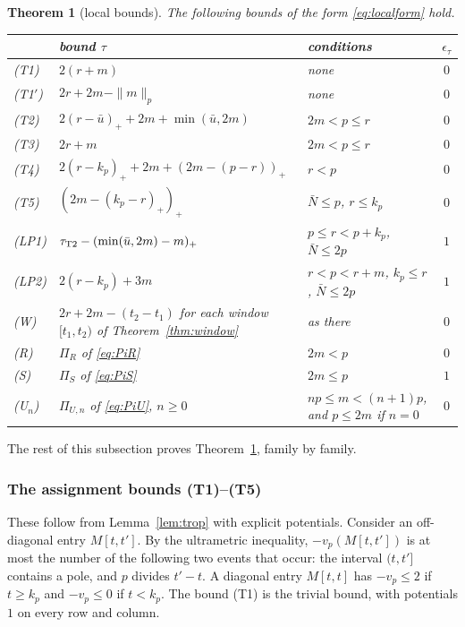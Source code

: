 \documentclass[11pt]{amsart}
\newtheorem{theorem}{Theorem}[section]
\theoremstyle{definition}
\theoremstyle{remark}
\numberwithin{equation}{section}
\begin{document}
\begin{theorem}[local bounds]\label{thm:local}
The following bounds of the form \eqref{eq:localform} hold.
\begin{center}
{\renewcommand{\arraystretch}{1.2}
\begin{tabular}{@{}lp{}p{}c@{}}
\toprule
 & bound $\tau$ & conditions & $\epsilon_\tau$\\
\midrule
(T1) & $2(r+m)$ & none & $0$\\
(T1$'$) & $2r+2m-\|m\|_p$ & none & $0$\\
(T2) & $2(r-\bar u)_++2m+\min(\bar u,2m)$ & $2m<p\le r$ & $0$\\
(T3) & $2r+m$ & $2m<p\le r$ & $0$\\
(T4) & $2(r-k_p)_++2m+(2m-(p-r))_+$ & $r<p$ & $0$\\
(T5) & $(2m-(k_p-r)_+)_+$ & $\bar N\le p$, $r\le k_p$ & $0$\\
(LP1) & $\tau_{\rm T2}-(\min(\bar u,2m)-m)_+$ & $p\le r<p+k_p$, $\bar N\le2p$ & $1$\\
(LP2) & $2(r-k_p)+3m$ & $r<p<r+m$, $k_p\le r$, $\bar N\le2p$ & $1$\\
(W) & $2r+2m-(t_2-t_1)$ for each window $[t_1,t_2)$ of Theorem~\ref{thm:window} & as there & $0$\\
(R) & $\Pi_R$ of \eqref{eq:PiR} & $2m<p$ & $0$\\
(S) & $\Pi_S$ of \eqref{eq:PiS} & $2m\le p$ & $1$\\
(U$_n$) & $\Pi_{U,n}$ of \eqref{eq:PiU}, $n\ge0$ & $np\le m<(n+1)p$, and $p\le2m$ if $n=0$ & $0$\\
\bottomrule
\end{tabular}}
\end{center}
\end{theorem}

The rest of this subsection proves Theorem~\ref{thm:local}, family by family.

\subsubsection{The assignment bounds (T1)--(T5)}\label{sssec:trop}
These follow from Lemma~\ref{lem:trop} with explicit potentials. Consider an off-diagonal entry $M[t,t']$. By the
ultrametric inequality, $-v_p(M[t,t'])$ is at most the number of the following two events that occur: the interval
$(t,t']$ contains a pole, and $p$ divides $t'-t$. A diagonal entry $M[t,t]$ has $-v_p\le2$ if $t\ge k_p$ and $-v_p\le0$
if $t<k_p$. The bound (T1) is the trivial bound, with potentials $1$ on every row and column.
\end{document}
